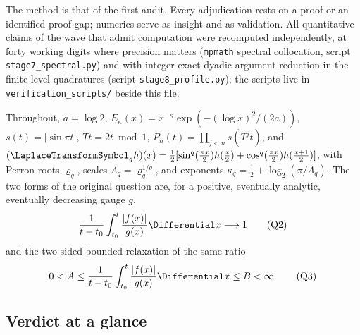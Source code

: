 \documentclass[11pt,oneside]{article}
\theoremstyle{definition}
\theoremstyle{remark}
\newcommand{\T}{T}
\begin{document}
The method is that of the first audit.  Every adjudication rests on a
proof or an identified proof gap; numerics serve as insight and as
validation.  All quantitative claims of the wave that admit computation
were recomputed independently, at forty working digits where precision
matters (\texttt{mpmath} spectral collocation, script
\nolinkurl{stage7_spectral.py}) and with integer-exact dyadic argument
reduction in the finite-level quadratures (script
\nolinkurl{stage8_profile.py}); the scripts live in
\nolinkurl{verification_scripts/} beside this file.

Throughout, $a=\log 2$,
$E_\kappa(x)=x^{-\kappa}\exp(-(\log x)^2/(2a))$,
$s(t)=|\sin\pi t|$, $\T t=2t\bmod 1$,
$P_n(t)=\prod_{j<n}s(\T^jt)$, and
$(\LaplaceTransformSymbol_qh)(x)=\frac12[\sin^q(\tfrac{\pi x}2)h(\tfrac x2)+
\cos^q(\tfrac{\pi x}2)h(\tfrac{x+1}2)]$, with Perron roots $\varrho_q$,
scales $\Lambda_q=\varrho_q^{1/q}$, and exponents
$\kappa_q=\frac12+\log_2(\pi/\Lambda_q)$.  The two forms of the original
question \cite{mse-decay} are, for a positive, eventually analytic,
eventually decreasing gauge $g$,
\begin{equation}
 \frac1{t-t_0}\int_{t_0}^t\frac{|f(x)|}{g(x)}\Differential x\longrightarrow1
 \tag{Q2}\label{eq:Q2}
\end{equation}
and the two-sided bounded relaxation of the same ratio
\begin{equation}
 0<A\le\frac1{t-t_0}\int_{t_0}^t\frac{|f(x)|}{g(x)}\Differential x\le B<\infty.
 \tag{Q3}\label{eq:Q3}
\end{equation}

\subsection*{Verdict at a glance}
\end{document}

